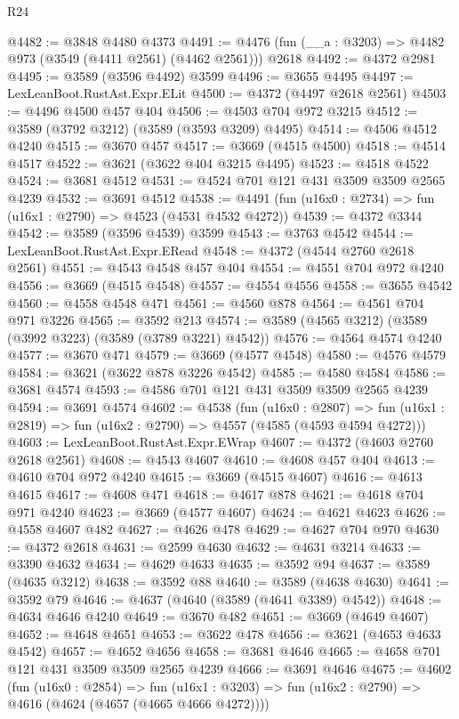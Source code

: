 \begin{lexlean}{R24}
\begin{coremodule}
@4482 := @3848 @4480 @4373
@4491 := @4476 (fun (__a : @3203) => @4482 @973 (@3549 (@4411 @2561) (@4462 @2561))) @2618
@4492 := @4372 @2981
@4495 := @3589 (@3596 @4492) @3599
@4496 := @3655 @4495
@4497 := LexLeanBoot.RustAst.Expr.ELit
@4500 := @4372 (@4497 @2618 @2561)
@4503 := @4496 @4500 @457 @404
@4506 := @4503 @704 @972 @3215
@4512 := @3589 (@3792 @3212) (@3589 (@3593 @3209) @4495)
@4514 := @4506 @4512 @4240
@4515 := @3670 @457
@4517 := @3669 (@4515 @4500)
@4518 := @4514 @4517
@4522 := @3621 (@3622 @404 @3215 @4495)
@4523 := @4518 @4522
@4524 := @3681 @4512
@4531 := @4524 @701 @121 @431 @3509 @3509 @2565 @4239
@4532 := @3691 @4512
@4538 := @4491 (fun (u16x0 : @2734) => fun (u16x1 : @2790) => @4523 (@4531 @4532 @4272))
@4539 := @4372 @3344
@4542 := @3589 (@3596 @4539) @3599
@4543 := @3763 @4542
@4544 := LexLeanBoot.RustAst.Expr.ERead
@4548 := @4372 (@4544 @2760 @2618 @2561)
@4551 := @4543 @4548 @457 @404
@4554 := @4551 @704 @972 @4240
@4556 := @3669 (@4515 @4548)
@4557 := @4554 @4556
@4558 := @3655 @4542
@4560 := @4558 @4548 @471
@4561 := @4560 @878
@4564 := @4561 @704 @971 @3226
@4565 := @3592 @213
@4574 := @3589 (@4565 @3212) (@3589 (@3992 @3223) (@3589 (@3789 @3221) @4542))
@4576 := @4564 @4574 @4240
@4577 := @3670 @471
@4579 := @3669 (@4577 @4548)
@4580 := @4576 @4579
@4584 := @3621 (@3622 @878 @3226 @4542)
@4585 := @4580 @4584
@4586 := @3681 @4574
@4593 := @4586 @701 @121 @431 @3509 @3509 @2565 @4239
@4594 := @3691 @4574
@4602 := @4538
    (fun (u16x0 : @2807) =>
    fun (u16x1 : @2819) => fun (u16x2 : @2790) => @4557 (@4585 (@4593 @4594 @4272)))
@4603 := LexLeanBoot.RustAst.Expr.EWrap
@4607 := @4372 (@4603 @2760 @2618 @2561)
@4608 := @4543 @4607
@4610 := @4608 @457 @404
@4613 := @4610 @704 @972 @4240
@4615 := @3669 (@4515 @4607)
@4616 := @4613 @4615
@4617 := @4608 @471
@4618 := @4617 @878
@4621 := @4618 @704 @971 @4240
@4623 := @3669 (@4577 @4607)
@4624 := @4621 @4623
@4626 := @4558 @4607 @482
@4627 := @4626 @478
@4629 := @4627 @704 @970
@4630 := @4372 @2618
@4631 := @2599 @4630
@4632 := @4631 @3214
@4633 := @3390 @4632
@4634 := @4629 @4633
@4635 := @3592 @94
@4637 := @3589 (@4635 @3212)
@4638 := @3592 @88
@4640 := @3589 (@4638 @4630)
@4641 := @3592 @79
@4646 := @4637 (@4640 (@3589 (@4641 @3389) @4542))
@4648 := @4634 @4646 @4240
@4649 := @3670 @482
@4651 := @3669 (@4649 @4607)
@4652 := @4648 @4651
@4653 := @3622 @478
@4656 := @3621 (@4653 @4633 @4542)
@4657 := @4652 @4656
@4658 := @3681 @4646
@4665 := @4658 @701 @121 @431 @3509 @3509 @2565 @4239
@4666 := @3691 @4646
@4675 := @4602
    (fun (u16x0 : @2854) =>
    fun (u16x1 : @3203) => fun (u16x2 : @2790) => @4616 (@4624 (@4657 (@4665 @4666 @4272))))

\end{coremodule}
\end{lexlean}
